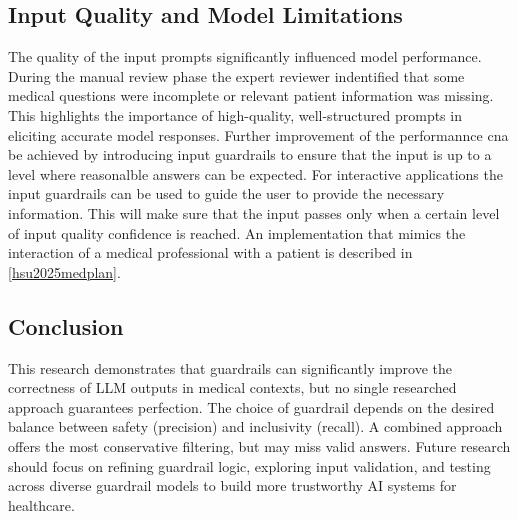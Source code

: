 \subsection{Input Quality and Model Limitations}
The quality of the input prompts significantly influenced model performance.
During the manual review phase the expert reviewer indentified that some medical questions were incomplete or relevant patient information was missing.
This highlights the importance of high-quality, well-structured prompts in eliciting accurate model responses.
Further improvement of the performannce cna be achieved by introducing input guardrails to ensure that the input is up to a level where reasonalble answers can be expected.
For interactive applications the input guardrails can be used to guide the user to provide the necessary information.
This will make sure that the input passes only when a certain level of input quality confidence is reached.
An implementation that mimics the interaction of a medical professional with a patient is described in \autoref{hsu2025medplan}.

\subsection*{Conclusion}
This research demonstrates that guardrails can significantly improve the correctness of LLM outputs in medical contexts, but no single researched approach guarantees perfection.
The choice of guardrail depends on the desired balance between safety (precision) and inclusivity (recall).
A combined approach offers the most conservative filtering, but may miss valid answers.
Future research should focus on refining guardrail logic, exploring input validation, and testing across diverse guardrail models to build more trustworthy AI systems for healthcare.
